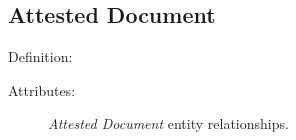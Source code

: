 
\subsection{Attested Document}

Definition: 

\vspace{1em}
\noindent Attributes:

\begin{figure}[ht]
    \begin{center}
        
    \end{center}
\label{fig:AttestedDocumentER}
\caption{\textit{Attested Document} entity relationships.}
\end{figure}

